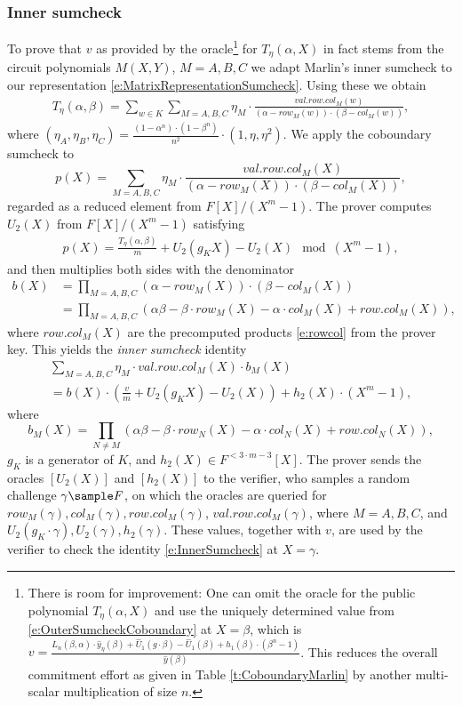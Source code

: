 \documentclass[10pt,article,oneside]{memoir}
\theoremstyle{definition}
\theoremstyle{remark}
\begin{document}
\subsubsection{Inner sumcheck}
To  prove that  $v$ as provided by the oracle\footnote{
There is room for improvement:
One can omit the oracle for the public polynomial $T_\eta(\alpha,X)$ and use the uniquely determined value from \eqref{e:OuterSumcheckCoboundary} at $X=\beta$, which is $v= \frac{L_n(\beta,\alpha)\cdot \hat y_\eta(\beta) +  \hat U_1(g\cdot \beta) - \hat U_1(\beta) + h_1(\beta)\cdot (\beta^n-1)}{\hat y(\beta)}$.
This reduces the overall commitment effort as given in Table \ref{t:CoboundaryMarlin} by another multi-scalar multiplication of size $n$.
}
for $T_\eta(\alpha,X)$ in fact stems from the circuit polynomials $M(X,Y)$, $M=A,B,C$ we adapt Marlin's inner sumcheck to our representation \eqref{e:MatrixRepresentationSumcheck}.
Using these we obtain
\begin{align}
\label{e:innerSumcheck}
T_\eta(\alpha, \beta)
=\sum_{w \in K }\sum_{M=A,B,C} \eta_M  \cdot \frac{val.row.col_M(w)}{(\alpha - row_M(w)) \cdot (\beta - col_M(w))},
\end{align}
where $(\eta_A,\eta_B,\eta_C)= \frac{(1-\alpha^n)\cdot (1-\beta^n)}{n^2}\cdot (1,\eta,\eta^2)$.
We apply the coboundary sumcheck to 
\[
p(X) = \sum_{M=A,B,C} \eta_M  \cdot \frac{val.row.col_M(X)}{(\alpha - row_M(X)) \cdot (\beta - col_M(X))},
\]
regarded as a reduced element from $F[X]/(X^m - 1)$.
The prover computes $U_2(X)$ from $F[X]/(X^m-1)$ satisfying
\begin{align*}
p(X) = \frac{T_\eta(\alpha,\beta)}{m} + U_2(g_K X) - U_2(X)  \mod (X^m-1),
\end{align*}
and then multiplies both sides with the denominator 
\begin{align*}
b(X) &= \prod_{M=A,B,C} (\alpha -row_M(X))\cdot (\beta - col_M(X))
\\
&=\prod_{M=A,B,C} \left(\alpha\beta - \beta \cdot row_M(X) - \alpha \cdot col_M(X) + row.col_M(X)\right),
\end{align*}
where $row.col_M(X)$ are the precomputed products \eqref{e:rowcol} from the prover key. 
This yields the \textit{inner sumcheck} identity
\begin{multline}
\label{e:InnerSumcheck}
\sum_{M=A,B,C} \eta_M \cdot val.row.col_M(X) \cdot b_M(X)
\\
= b(X) \cdot \left(\frac{v}{m} + U_2(g_K X) - U_2(X)\right) + h_2(X)\cdot (X^m -1 ),
\end{multline}
where 
\[
b_M(X) = \prod_{N \neq M} \left(\alpha\beta - \beta \cdot row_N(X) - \alpha \cdot col_N(X) + row.col_N(X)\right),
\]
$g_K$ is a generator of $K$, and $h_2(X) \in F^{< 3\cdot m - 3}[X]$.
The prover sends the oracles $[U_2(X)]$ and $[h_2(X)]$ to the verifier, who samples a random challenge $\gamma\sample F$, 
on which the oracles are queried for
$row_M(\gamma), col_M(\gamma), row.col_M(\gamma)$, $val.row.col_M(\gamma)$, where $M=A,B,C$,
and $U_2(g_K \cdot\gamma), U_2(\gamma), h_2(\gamma)$.
These values, together with $v$, are used by the verifier to check the identity \eqref{e:InnerSumcheck} at $X=\gamma$.
\end{document}
